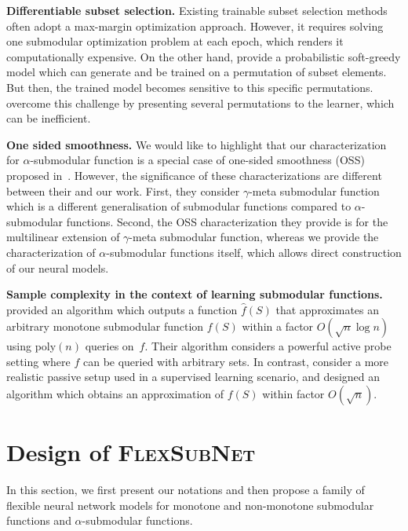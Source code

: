 \documentclass{article}
\newcommand{\our}{\textsc{Flex\-Sub\-Net}}
\newcommand{\xhdr}[1]{\noindent\textbf{#1.}}
\renewcommand{\cite}{\citep}
\begin{document}
\xhdr{Differentiable subset selection} 
Existing trainable subset selection methods~\cite{tschiatschek2014learning, kothawade2020deep} often adopt a max-margin optimization approach.
However, it requires solving one submodular optimization problem at each epoch, which renders it computationally expensive. On the other hand, \citet{tschiatschek2018differentiable} provide a probabilistic soft-greedy model which can generate and  be trained on a permutation of subset elements.
%
But then, the trained model becomes sensitive to this specific permutations.~\citet{tschiatschek2018differentiable} overcome this challenge by presenting
several permutations to the learner, which can be inefficient. 

 \xhdr{One sided smoothness} 
We would like to highlight that our characterization for $\alpha$-submodular function is a special case of one-sided smoothness (OSS) proposed in~\cite{oss1,oss2}. However, the significance of these characterizations are different between their and our work. First, they consider $\gamma$-meta submodular function which is a  different generalisation of submodular functions compared to $\alpha$-submodular functions. Second, the OSS characterization they provide is for the multilinear extension of $\gamma$-meta submodular function, whereas we provide the characterization of $\alpha$-submodular functions itself, which allows direct construction of our neural models. 

 \xhdr{Sample complexity in the context of learning submodular functions}
~\citet{reb} provided an algorithm which outputs a function $\hat{f}(S)$ that approximates an arbitrary monotone submodular function $f(S)$ within a factor $O(\sqrt{n}\log n)$ using poly$(n)$ queries on~$f$.  Their algorithm considers a powerful active probe setting where $f$ can be queried with arbitrary sets. In contrast, \citet{balcan2011learning} consider a more realistic passive setup used in a supervised learning scenario, and designed an algorithm which obtains an approximation of $f(S)$ within factor $O(\sqrt{n})$.

\section{Design of \our}
\label{sec:subm}

In this section, we  first present our notations and then propose a family of flexible neural network models 
for monotone and non-monotone submodular functions and   $\alpha$-submodular functions.
\end{document}
